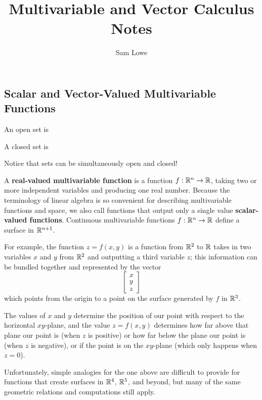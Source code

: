 

\title{Multivariable and Vector Calculus Notes}
\author{Sam Lowe}



\maketitle

\tableofcontents

\pagebreak

\begin{center}
\section{Scalar and Vector-Valued Multivariable Functions}
\end{center}

An open set is

A closed set is

Notice that sets can be simultaneously open and closed!

A \textbf{real-valued multivariable function} is a function $f : \mathbb{R}^n \to \mathbb{R}$, taking two or more independent variables and producing one real number. Because the terminology of linear algebra is so convenient for describing multivariable functions and space, we also call functions that output only a single value \textbf{scalar-valued functions}. Continuous multivariable functions $f: \mathbb{R}^n \to \mathbb{R}$ define a surface in $\mathbb{R}^{n+1}$.

For example, the function $z = f(x,y)$ is a function from $\mathbb{R}^2$ to $\mathbb{R}$ takes in two variables $x$ and $y$ from $\mathbb{R}^2$ and outputting a third variable $z$; this information can be bundled together and represented by the vector $$\begin{bmatrix}
x\\
y\\
z
\end{bmatrix} $$ which points from the origin to a point on the surface generated by $f$ in $\mathbb{R}^3$.

The values of $x$ and $y$ determine the position of our point with respect to the horizontal $xy$-plane, and the value $z=f(x,y)$ determines how far above that plane our point is (when $z$ is positive) or how far below the plane our point is (when $z$ is negative), or if the point is on the $xy$-plane (which only happens when $z=0$).

Unfortunately, simple analogies for the one above are difficult to provide for functions that create surfaces in $\mathbb{R}^4$, $\mathbb{R}^5$, and beyond, but many of the same geometric relations and computations still apply.

